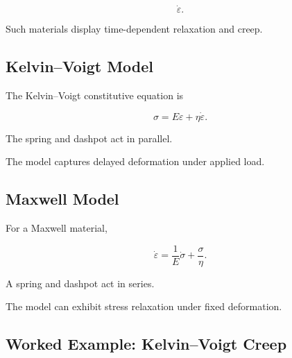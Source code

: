 \[
\boxed{
\dot{\varepsilon}.
}
\]

Such materials display time-dependent relaxation and creep.

\subsection{Kelvin--Voigt Model}
\label{subsec:kelvin-voigt-model}

The Kelvin--Voigt constitutive equation is

\[
\boxed{
\sigma
=
E\varepsilon
+
\eta\dot{\varepsilon}.
}
\]

The spring and dashpot act in parallel.

The model captures delayed deformation under applied load.

\subsection{Maxwell Model}
\label{subsec:maxwell-viscoelastic-model}

For a Maxwell material,

\[
\boxed{
\dot{\varepsilon}
=
\frac{1}{E}\dot{\sigma}
+
\frac{\sigma}{\eta}.
}
\]

A spring and dashpot act in series.

The model can exhibit stress relaxation under fixed deformation.

\subsection{Worked Example: Kelvin--Voigt Creep}
\label{subsec:worked-kelvin-voigt-creep}


